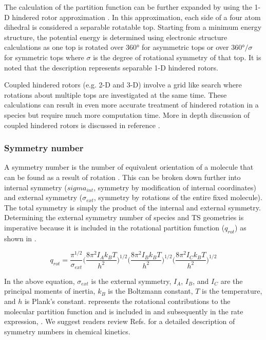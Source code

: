 \documentclass[preprint, 11pt]{elsarticle} %
\begin{document}
The calculation of the partition function can be further expanded by using the 1-D hindered rotor approximation \cite{pitzer:1942, pfaendtner:2007, Lin:2008}. 
In this approximation, each side of a four atom dihedral is considered a separable rotatable top.
Starting from a minimum energy structure, the potential energy is determined using electronic structure calculations as one top is rotated over \ang{360} for asymmetric tops or over $\ang{360}/\sigma$ for symmetric tops where $\sigma$ is the degree of rotational symmetry of that top. 
It is noted that the description represents separable 1-D hindered rotors.

Coupled hindered rotors (e.g. 2-D and 3-D) involve a grid like search where rotations about multiple tops are investigated at the same time. 
These calculations can result in even more accurate treatment of hindered rotation in a species but require much more computation time.
More in depth discussion of coupled hindered rotors is discussed in reference \cite{fernandez:2013}.


\subsubsection{Symmetry number}

A symmetry number is the number of equivalent orientation of a molecule that can be found as a result of rotation \cite{Lynch:2004, gilson:2010}.
This can be broken down further into internal symmetry ($sigma_{int}$, symmetry by modification of internal coordinates) and external symmetry ($\sigma_{ext}$, symmetry by rotations of the entire fixed molecule).
The total symmetry is simply the product of the internal and external symmetry.
Determining the external symmetry number of species and TS geometries is imperative because it is included in the rotational partition function ($q_{rot}$) as shown in .

\begin{equation}
    q_{rot} = \frac{\pi^{1/2}}{\sigma_{ext}}\Big(\frac{8 \pi^2 I_A k_B T}{h^2}\Big)^{1/2} \Big(\frac{8 \pi^2 I_B k_B T}{h^2}\Big)^{1/2} \Big(\frac{8 \pi^2 I_C k_B T}{h^2}\Big)^{1/2}
    \label{eq:q_rot}
\end{equation}

In the above equation, $\sigma_{ext}$ is the external symmetry, $I_A$, $I_B$, and $I_C$ are the principal moments of inertia, $k_B$ is the Boltzmann constant, $T$ is the temperature, and $h$ is Plank's constant. 
 represents the rotational contributions to the molecular partition function and is included in  and subsequently in the rate expression, . 
We suggest readers review Refs. \cite{FernandezRamos:2007, Pollak:1978} for a detailed description of symmetry numbers in chemical kinetics.
\end{document}
